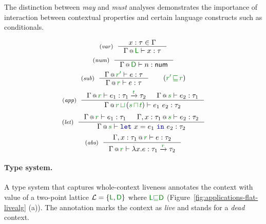 The distinction between \emph{may} and \emph{must} analyses demonstrates the importance of
interaction between contextual properties and certain language constructs such as conditionals.



\begin{figure}[t]
\begin{equation*}
\tyrule{var}
  {x : \tau \in \Gamma}
  {\coctx{\Gamma}{\cclrd{\cclrd{\ident{L}} }} \vdash x : \tau }
\end{equation*}
\begin{equation*}
\tyrule{num}
  {~}
  {\coctx{\Gamma}{ \cclrd{\cclrd{\ident{D}}} } \vdash n : \ident{num} }
\end{equation*}
\begin{equation*}
\tyrule{sub}
  {\coctx{\Gamma}{\cclrd{r'}} \vdash e : \tau }
  {\coctx{\Gamma}{\cclrd{r}} \vdash e : \tau }\quad\quad(\cclrd{r'} \,\cclrd{\sqsubseteq}\, \cclrd{r})
\end{equation*}
\begin{equation*}
\tyrule{app}
  {\coctx{\Gamma}{\cclrd{r}} \vdash e_1 : \tau_1 \xrightarrow{\cclrd{t}} \tau_2 &
   \coctx{\Gamma}{\cclrd{s}} \vdash e_2 : \tau_1 }
  {\coctx{\Gamma}{\cclrd{r} \,\cclrd{\sqcup}\, (\cclrd{s} \,\cclrd{\sqcap}\, \cclrd{t})} \vdash e_1~e_2 : \tau_2}
\end{equation*}
\begin{equation*}
\tyrule{let}
  { \coctx{\Gamma}{\cclrd{r}} \vdash e_1 : \tau_1 &
    \coctx{\Gamma, x:\tau_1}{\cclrd{s}} \vdash e_2 : \tau_2}
  {\coctx{\Gamma}{\cclrd{s}} \vdash \kvd{let}~x=e_1~\kvd{in}~e_2 : \tau_2 }
\end{equation*}
\begin{equation*}
\tyrule{abs}
  {\coctx{\Gamma, x:\tau_1}{\cclrd{r}} \vdash e : \tau_2}
  {\coctx{\Gamma}{\cclrd{r}} \vdash \lambda x.e : \tau_1 \xrightarrow{\cclrd{r}} \tau_2 }
\end{equation*}
\vspace{-0.9em}

\label{fig:applications-flat-liveness}
\vspace{-1.2em}
\end{figure}


\paragraph{Type system.}
A type system that captures whole-context liveness annotates the context with value of a
two-point lattice $\mathcal{L} = \{ \cclrd{\ident{L}}, \cclrd{\ident{D}} \}$ where 
$\cclrd{\ident{L}} \cclrd{\sqsubseteq} \cclrd{\ident{D}}$ (Figure~\ref{fig:applications-flat-livealg} (a)). 
The annotation  marks the context as \emph{live} and  stands 
for a \emph{dead} context.

